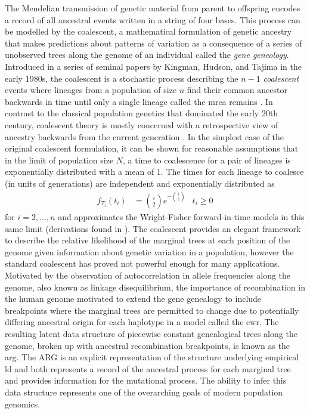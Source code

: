 The Mendelian transmission of genetic material from parent to offspring encodes a record of all ancestral events written in a string of four bases. This process can be modelled by the coalescent, a mathematical formulation of genetic ancestry that makes predictions about patterns of variation as a consequence of a series of unobserved trees along the genome of an individual called the \textit{gene geneology}. Introduced in a series of seminal papers by Kingman, Hudson, and Tajima in the early 1980s, the coalescent is a stochastic process describing the $n-1$ \textit{coalescent} events where lineages from a population of size $n$ find their common ancestor backwards in time until only a single lineage called the \gls{mrca} remains \cite{Hudson1983,Kingman1982,Kingman1982a,F1983}. In contrast to the classical population genetics that dominated the early 20th century, coalescent theory is mostly concerned with a retrospective view of ancestry backwards from the current generation \cite{Ewens1990}. In the simplest case of the original coalescent formulation, it can be shown for reasonable assumptions that in the limit of population size $N$, a time to coalescence for a pair of lineages is exponentially distributed with a mean of 1. The times for each lineage to coalesce (in units of generations) are independent and exponentially distributed as $$ \begin{aligned} f_{T_i} (t_i) &=  \binom{i}{2}  e^{- \binom{i}{2}}  &t_i \geq 0 \end{aligned}$$ for $i = 2, \ldots, n$ and approximates the Wright-Fisher forward-in-time models in this same limit (derivations found in \textcite[Chapter 3.2]{Wakeley2009a}). The coalescent provides an elegant framework to describe the relative likelihood of the marginal trees at each position of the genome given information about genetic variation in a population, however the standard coalescent has proved not powerful enough for many applications. Motivated by the observation of autocorrelation in allele frequencies along the genome, also known as linkage disequilibrium, the importance of recombination in the human genome motivated \textcite{Griffiths1997a} to extend the gene genealogy to include breakpoints where the marginal trees are permitted to change due to potentially differing ancestral origin for each haplotype in a model called the \gls{cwr}. The resulting latent data structure of piecewise constant genealogical trees along the genome, broken up with ancestral recombination breakpoints, is known as the \gls{arg}. The ARG is an explicit representation of the structure underlying empirical \gls{ld} and both represents a record of the ancestral process for each marginal tree and provides information for the mutational process. The ability to infer this data structure represents one of the overarching goals of modern population genomics.  

